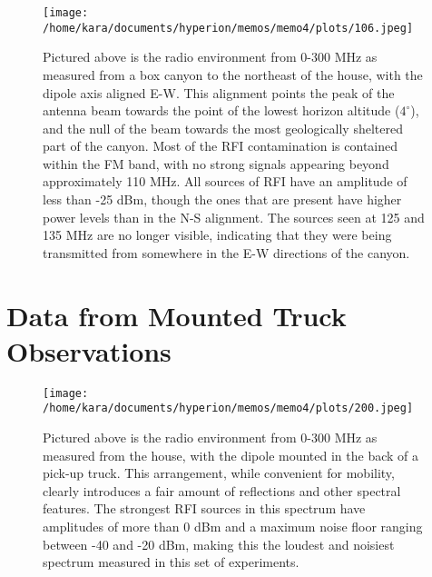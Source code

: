 \documentclass[11pt]{article}
\begin{document}
\begin{figure}[H]
 \begin{center}
 \texttt{[image: /home/kara/documents/hyperion/memos/memo4/plots/106.jpeg]}
 \end{center}
 \caption{
        Pictured above is the radio environment from 0-300 MHz as measured from 
        a box canyon to the northeast of the house, with the dipole axis 
        aligned E-W. This alignment points the peak of the antenna beam towards 
        the point of the lowest horizon altitude ($4^{\circ}$), and the null of 
        the beam towards the most geologically sheltered part of the canyon.  
        Most of the RFI contamination is contained within the FM band, with no 
        strong signals appearing beyond approximately 110 MHz. All sources of 
        RFI have an amplitude of less than -25 dBm, though the ones that are 
        present have higher power levels than in the N-S alignment. The sources 
        seen at 125 and 135 MHz are no longer visible, indicating that they 
        were being transmitted from somewhere in the E-W directions of the 
        canyon.
 }
\end{figure}

\section{Data from Mounted Truck Observations}

\begin{figure}[H]
    \begin{center}
    \texttt{[image: /home/kara/documents/hyperion/memos/memo4/plots/200.jpeg]}
    \end{center}
    \caption{
        Pictured above is the radio environment from 0-300 MHz as measured from 
        the house, with the dipole mounted in the back of a pick-up truck.  
        This arrangement, while convenient for mobility, clearly introduces a 
        fair amount of reflections and other spectral features. The strongest 
        RFI sources in this spectrum have amplitudes of more than 0 dBm and a 
        maximum noise floor ranging between -40 and -20 dBm, making this the 
        loudest and noisiest spectrum measured in this set of experiments.
    }
    \label{fig:200}
\end{figure}
\end{document}
